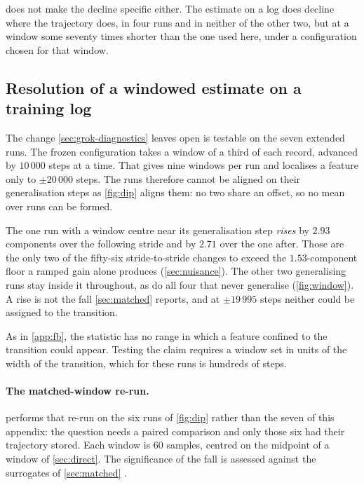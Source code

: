 \documentclass{article}
\begin{document}
 does not make the decline specific either. The estimate on a log does decline where the
trajectory does, in four runs and in neither of the other two, but at a window some seventy times
shorter than the one used here, under a configuration chosen for that window.

\subsection{Resolution of a windowed estimate on a training log}\label{app:window}

The change \cref{sec:grok-diagnostics} leaves open is testable on the seven extended runs. The
frozen configuration takes a window of a third of each record, advanced by $10\,000$ steps at a
time. That gives nine windows per run and localises a feature only to $\pm 20\,000$ steps. The runs therefore cannot be aligned on
their generalisation steps as \cref{fig:dip} aligns them: no two share an offset, so no mean over
runs can be formed.

The one run with a window centre near its generalisation step \emph{rises} by $2.93$ components
over the following stride and by $2.71$ over the one after. Those are the only two of the
fifty-six stride-to-stride changes to exceed the $1.53$-component floor a ramped gain alone
produces (\cref{sec:nuisance}). The other two generalising runs stay inside it throughout, as do
all four that never generalise (\cref{fig:window}). A rise is not the fall \cref{sec:matched}
reports, and at $\pm 19\,995$ steps neither could be assigned to the transition.

As in \cref{app:fb}, the statistic has no range in which a feature confined to the transition could
appear. Testing the claim requires a window set in units of the width of the transition, which for
these runs is hundreds of steps.

\paragraph{The matched-window re-run.}  performs that re-run on the six runs of
\cref{fig:dip} rather than the seven of this appendix: the question needs a paired comparison and
only those six had their trajectory stored. Each window is $60$ samples, centred on the midpoint of
a window of \cref{sec:direct}. The significance of the fall is assessed against the surrogates of
\cref{sec:matched} \citep{theiler1992testing, schreiber1996improved}.
\end{document}
